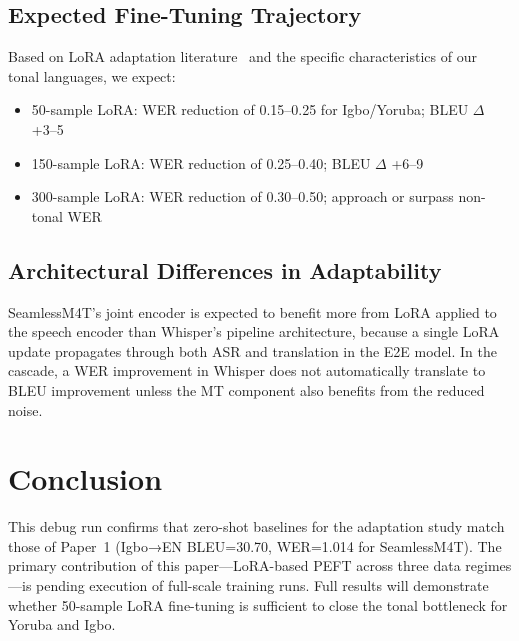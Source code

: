 \documentclass[11pt,a4paper]{article}
\begin{document}
\subsection{Expected Fine-Tuning Trajectory}
Based on LoRA adaptation literature~\citep{majumdar2023lora,hu2022lora} and the specific characteristics of our tonal languages, we expect:
\begin{itemize}
  \item 50-sample LoRA: WER reduction of 0.15–0.25 for Igbo/Yoruba; BLEU $\Delta$ +3–5
  \item 150-sample LoRA: WER reduction of 0.25–0.40; BLEU $\Delta$ +6–9
  \item 300-sample LoRA: WER reduction of 0.30–0.50; approach or surpass non-tonal WER
\end{itemize}

\subsection{Architectural Differences in Adaptability}
SeamlessM4T's joint encoder is expected to benefit more from LoRA applied to the speech encoder than Whisper's pipeline architecture, because a single LoRA update propagates through both ASR and translation in the E2E model. In the cascade, a WER improvement in Whisper does not automatically translate to BLEU improvement unless the MT component also benefits from the reduced noise.

\section{Conclusion}
\label{sec:conclusion}

This debug run confirms that zero-shot baselines for the adaptation study match those of Paper~1 (Igbo→EN BLEU=30.70, WER=1.014 for SeamlessM4T). The primary contribution of this paper—LoRA-based PEFT across three data regimes—is pending execution of full-scale training runs. Full results will demonstrate whether 50-sample LoRA fine-tuning is sufficient to close the tonal bottleneck for Yoruba and Igbo.



\end{document}
